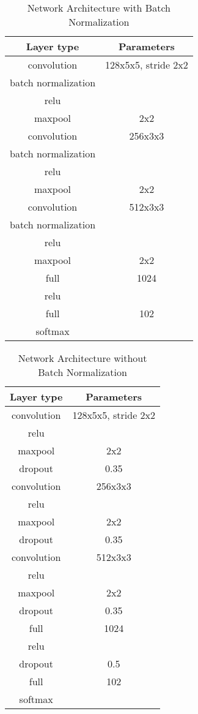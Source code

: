 \documentclass[a4paper, 11pt]{article}
\begin{document}
\begin{table}[h!]
	\begin{center}
		\begin{tabular}{|c|c|}
			\hline Layer type & Parameters \\ 
			\hline convolution & 128x5x5, stride 2x2 \\ 
			\hline batch normalization & \\
			\hline relu &\\
			\hline maxpool &  2x2\\ 
			\hline convolution & 256x3x3 \\ 
			\hline batch normalization & \\
			\hline relu &\\
			\hline maxpool &  2x2\\ 
			\hline convolution & 512x3x3 \\ 
			\hline batch normalization & \\
			\hline relu &\\
			\hline maxpool &  2x2\\ 
			\hline full &  1024 \\ 
			\hline relu &\\
			\hline full &  102 \\
			\hline softmax & \\
			\hline
		\end{tabular}
	\end{center}
	\caption{Network Architecture with Batch Normalization}
\end{table}

\begin{table}[h!]
	\begin{center}
		\begin{tabular}{|c|c|}
			\hline Layer type & Parameters \\ 
			\hline convolution & 128x5x5, stride 2x2 \\ 
			\hline relu &\\
			\hline maxpool &  2x2\\ 
			\hline dropout & 0.35 \\
			\hline convolution & 256x3x3 \\ 
			\hline relu &\\
			\hline maxpool &  2x2\\ 
			\hline dropout & 0.35 \\
			\hline convolution & 512x3x3 \\ 
			\hline relu &\\
			\hline maxpool &  2x2\\ 
			\hline dropout & 0.35 \\
			\hline full &  1024 \\ 
			\hline relu &\\
			\hline dropout & 0.5 \\
			\hline full &  102 \\
			\hline softmax & \\
			\hline
		\end{tabular}
	\end{center}
	\caption{Network Architecture without Batch Normalization}
\end{table}
\end{document}
